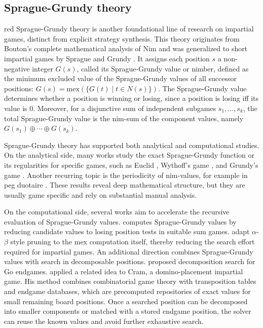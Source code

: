 \documentclass[review]{elsarticle}
\begin{document}
\subsection{Sprague-Grundy theory}
\begin{color}{red}
Sprague-Grundy theory is another foundational line of research on impartial games, distinct from explicit strategy synthesis. 
This theory originates from Bouton's complete mathematical analysis of Nim \cite{Bou1901} and was generalized to short impartial games by Sprague \cite{sprague1935} and Grundy \cite{grundy1939}. 
It assigns each position $s$ a non-negative integer $G(s)$, called its Sprague-Grundy value or nimber, defined as the minimum excluded value of the Sprague-Grundy values of all successor positions:
$G(s) = \text{mex}(\{G(t) \mid t \in N(s)\})$.
The Sprague-Grundy value determines whether a position is winning or losing, since a position is losing iff its value is $0$.
Moreover, for a disjunctive sum of independent subgames $s_1,\ldots,s_k$, the total Sprague-Grundy value is the nim-sum of the component values, namely $G(s_1) \oplus \cdots \oplus G(s_k)$.

Sprague-Grundy theory has supported both analytical and computational studies. 
On the analytical side, many works study the exact Sprague-Grundy function or its regularities for specific games, such as Euclid \cite{cairns2011,nivasch2006}, Wythoff's game \cite{blass1990}, and Grundy's game \cite{guy1956g}. 
Another recurring topic is the periodicity of nim-values, for example in peg duotaire \cite{grossman2004}. 
These results reveal deep mathematical structure, but they are usually game specific and rely on substantial manual analysis.

On the computational side, several works aim to accelerate the recursive evaluation of Sprague-Grundy values. 
\citet{lemoine2012} computes Sprague-Grundy values by reducing candidate values to losing position tests in suitable sum games. 
\citet{BelM2020} adapt $\alpha$-$\beta$ style pruning to the mex computation itself, thereby reducing the search effort required for impartial games. 
An additional direction combines Sprague-Grundy values with search in decomposable positions. 
\citet{muller1999} proposed decomposition search for Go endgames. 
\citet{uiterwijk2019} applied a related idea to Cram, a domino-placement impartial game. 
His method combines combinatorial game theory with transposition tables and endgame databases, which are precomputed repositories of exact values for small remaining board positions. 
Once a searched position can be decomposed into smaller components or matched with a stored endgame position, the solver can reuse the known values and avoid further exhaustive search. 


\end{color}
\end{document}
